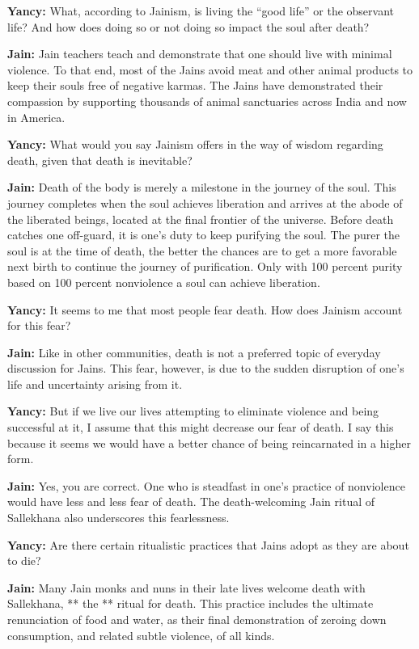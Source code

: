 \textbf{Yancy:} What, according to Jainism, is living the ``good life''
or the observant life? And how does doing so or not doing so impact the
soul after death?

\textbf{Jain:} Jain teachers teach and demonstrate that one should live
with minimal violence. To that end, most of the Jains avoid meat and
other animal products to keep their souls free of negative karmas. The
Jains have demonstrated their compassion by supporting thousands of
animal sanctuaries across India and now in America.

\textbf{Yancy:} What would you say Jainism offers in the way of wisdom
regarding death, given that death is inevitable?

\textbf{Jain:} Death of the body is merely a milestone in the journey of
the soul. This journey completes when the soul achieves liberation and
arrives at the abode of the liberated beings, located at the final
frontier of the universe. Before death catches one off-guard, it is
one's duty to keep purifying the soul. The purer the soul is at the time
of death, the better the chances are to get a more favorable next birth
to continue the journey of purification. Only with 100 percent purity
based on 100 percent nonviolence a soul can achieve liberation.

\textbf{Yancy:} It seems to me that most people fear death. How does
Jainism account for this fear?

\textbf{Jain:} Like in other communities, death is not a preferred topic
of everyday discussion for Jains. This fear, however, is due to the
sudden disruption of one's life and uncertainty arising from it.

\textbf{Yancy:} But if we live our lives attempting to eliminate
violence and being successful at it, I assume that this might decrease
our fear of death. I say this because it seems we would have a better
chance of being reincarnated in a higher form.

\textbf{Jain:} Yes, you are correct. One who is steadfast in one's
practice of nonviolence would have less and less fear of death. The
death-welcoming Jain ritual of Sallekhana also underscores this
fearlessness.

\textbf{Yancy:} Are there certain ritualistic practices that Jains adopt
as they are about to die?

\textbf{Jain:} Many Jain monks and nuns in their late lives welcome
death with Sallekhana, ** the ** ritual for death. This practice
includes the ultimate renunciation of food and water, as their final
demonstration of zeroing down consumption, and related subtle violence,
of all kinds.

